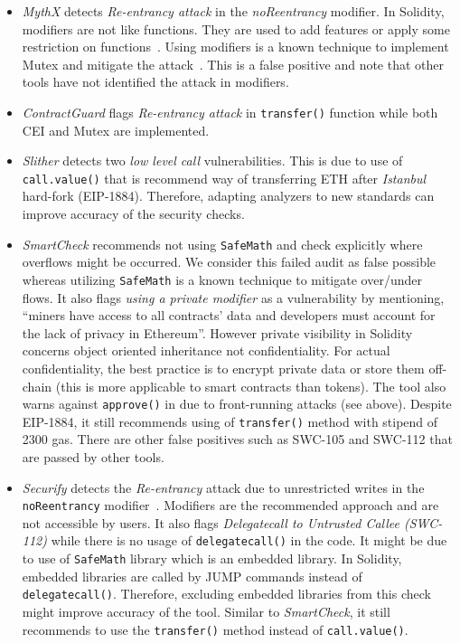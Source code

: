 \begin{itemize}
	\item \textit{MythX} detects \textit{Re-entrancy attack} in the \textit{noReentrancy} modifier. In Solidity, modifiers are not like functions. They are used to add features or apply some restriction on functions~\cite{SolidityModifer}. Using modifiers is a known technique to implement Mutex and mitigate the attack~\cite{ReentrancyGuard}. This is a false positive and note that other tools have not identified the attack in modifiers.

	\item \textit{ContractGuard} flags \textit{Re-entrancy attack} in \texttt{transfer()} function while both CEI and Mutex are implemented.

	\item \textit{Slither} detects two \textit{low level call} vulnerabilities\cite{SlitherSetup}. This is due to use of \texttt{call.value()} that is recommend way of transferring ETH after \textit{Istanbul} hard-fork (EIP-1884).	Therefore, adapting analyzers to new standards can improve accuracy of the security checks.

	\item \textit{SmartCheck} recommends not using \texttt{SafeMath} and check explicitly where overflows might be occurred. We consider this failed audit as false possible whereas utilizing \texttt{SafeMath} is a known technique to mitigate over/under flows. It also flags \textit{using a private modifier} as a vulnerability by mentioning, ``miners have access to all contracts' data and developers must account for the lack of privacy in Ethereum''. However private visibility in Solidity concerns object oriented inheritance not confidentiality. For actual confidentiality, the best practice is to encrypt private data or store them off-chain (this is more applicable to smart contracts than \erc tokens). The tool also warns against \texttt{approve()} in \erc due to front-running attacks (see above). Despite EIP-1884, it still recommends using of \texttt{transfer()} method with stipend of 2300 gas. There are other false positives such as SWC-105 and SWC-112 that are passed by other tools.

	\item \textit{Securify} detects the \textit{Re-entrancy} attack due to unrestricted writes in the \texttt{noReentrancy} modifier~\cite{SECURIFY}. Modifiers are the recommended approach and are not accessible by users. It also flags \textit{Delegatecall to Untrusted Callee (SWC-112)} while there is no usage of \texttt{delegatecall()} in the code. It might be due to use of \texttt{SafeMath} library which is an embedded library. In Solidity, embedded libraries are called by JUMP commands instead of \texttt{delegatecall()}. Therefore, excluding embedded libraries from this check might improve accuracy of the tool. Similar to \textit{SmartCheck}, it still recommends to use the \texttt{transfer()} method instead of \texttt{call.value()}.


\end{itemize}
